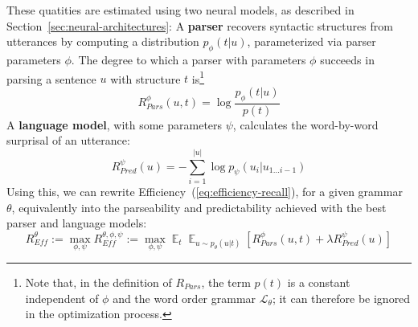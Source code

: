 \documentclass[10pt,twoside,lineno]{article}
\DeclareMathOperator*{\argmax}{arg\,max}
\DeclareMathOperator{\E}{\mathop{\mathbb{E}}}
\newcommand{\key}[1]{\textbf{#1}}
\newcommand{\utterance}{\mathcal{U}}
\newcommand{\tree}{\mathcal{T}}
\begin{document}
These quatities are estimated using two neural models, as described in Section~\ref{sec:neural-architectures}:
A \key{parser} recovers syntactic structures from utterances by computing a distribution $p_\phi(t|u)$, parameterized via parser parameters $\phi$.
The degree to which a parser with parameters $\phi$ succeeds in parsing a sentence $u$ with structure $t$ is\footnote{Note that, in the definition of $R_{Pars}$, the term $p(t)$ is a constant independent of $\phi$ and the word order grammar $\mathcal{L}_\theta$; it can therefore be ignored in the optimization process.} 
\begin{equation}
	R_{Pars}^{\phi}(u,t) =  \log \frac{p_\phi(t|u)}{p(t)}
\end{equation}
%
A \key{language model}, with some parameters $\psi$, calculates the word-by-word surprisal of an utterance:
\begin{equation}
	R_{Pred}^{\psi}(u) = - \sum_{i=1}^{|u|} \log p_\psi(u_i|u_{1\dots i-1})
\end{equation}
Using this, we can rewrite Efficiency~(\ref{eq:efficiency-recall}), for a given grammar $\theta$, equivalently into the parseability and predictability achieved with the best parser and language models:
\begin{equation}\label{eq:efficiency-rewrite}
	R_{\textit{Eff}}^{\theta} := \max_{\phi,\psi} R_{\textit{Eff}}^{\theta, \phi, \psi} := \max_{\phi,\psi} \E_t \E_{u \sim p_\theta(u|t)} \left[R_{Pars}^{\phi}(u,t) + \lambda R_{Pred}^{\psi}(u)\right]
\end{equation}
%
%
\end{document}
